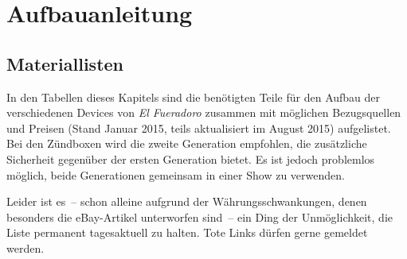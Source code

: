 \documentclass[paper=a4, parskip, numbers=noenddot, toc=listof, headsepline]{scrbook}
\newcommand{\anlage}{\emph{El Fueradoro}}
\begin{document}
	\part{Aufbauanleitung}
		\label{part:aufbauanleitung}

		\chapter{Materiallisten}

			In den Tabellen dieses Kapitels sind die benötigten Teile für den Aufbau der verschiedenen Devices von {\anlage} zusammen mit möglichen Bezugsquellen und Preisen (Stand Januar 2015, teils aktualisiert im August 2015) aufgelistet. Bei den Zündboxen wird die zweite Generation empfohlen, die zusätzliche Sicherheit gegenüber der ersten Generation bietet. Es ist jedoch problemlos möglich, beide Generationen gemeinsam in einer Show zu verwenden.

			Leider ist es~-- schon alleine aufgrund der Währungsschwankungen, denen besonders die eBay-Artikel unterworfen sind~-- ein Ding der Unmöglichkeit, die Liste permanent tagesaktuell zu halten. Tote Links dürfen gerne gemeldet werden.
\end{document}
